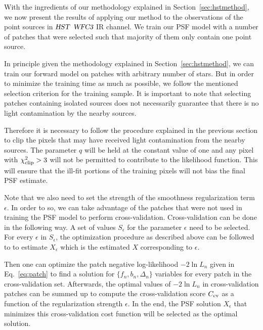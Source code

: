 With the ingredients of our methodology explained in Section~\ref{sec:hstmethod}, we now present the results of applying our 
method to the observations of the point sources in ${\textsl{HST}}$ ${\textsl{WFC3}}$ IR channel. We train our PSF model with a number of 
patches that were selected such that majority of them only contain one point source. 

In principle given the methodology explained in Section~\ref{sec:hstmethod}, we can train our forward model on patches with arbitrary 
number of stars. But in order to minimize the training time as much as possible, we follow the mentioned selection criterion for the 
training sample.
It is important to note that selecting patches containing isolated sources does not necessarily guarantee that there is no light contamination 
by the nearby sources. %

Therefore it is necessary to follow the procedure explained in the previous section to clip the pixels that may have received light 
contamination from the nearby sources. The parameter $q$ will be held at the constant value of one and any pixel with $\chi^{2}_{\rm clip} > 3 $ 
will not be permitted to contribute to the likelihood function. 
This will ensure that the ill-fit portions of the training pixels will not bias the final PSF estimate. 

Note that we also need to set the strength of the smoothness regularization term $\epsilon$. In order to so, we can take advantage of the patches that were not used 
in training the PSF model to perform cross-validation. Cross-validation can be done in the following way. A set of values $S_{\epsilon}$ for the parameter $\epsilon$ need to be selected. For every $\epsilon$ in $S_{\epsilon}$, the optimization procedure as described above can be followed to to estimate $X_{\epsilon}$ which is the estimated $X$ corresponding to $\epsilon$. 

Then one can optimize the patch negative log-likelihood $-2\ln L_n$ given in Eq.~\ref{eq:patch} to find a solution for $\{f_n,b_n,\Delta_n\}$
variables for every patch in the cross-validation set. Afterwards, the optimal values of $-2\ln L_n$ in cross-validation patches can be summed up to 
compute the cross-validation score $C_{\rm cv}$ as a function of the regularization strength $\epsilon$.
In the end, the PSF solution $X_{\epsilon}$ that minimizes this cross-validation cost function will be selected as the optimal solution.


